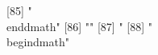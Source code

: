  [85] "\\end{dmath}"                                                                                                                                                                                                                                                                                                                                                                                                                                                                                
 [86] ""                                                                                                                                                                                                                                                                                                                                                                                                                                                                                            
 [87] "%
 [88] "\\begin{dmath}"                                                                                                                                                                                                                                                                                                                                                                                                                                                                              
